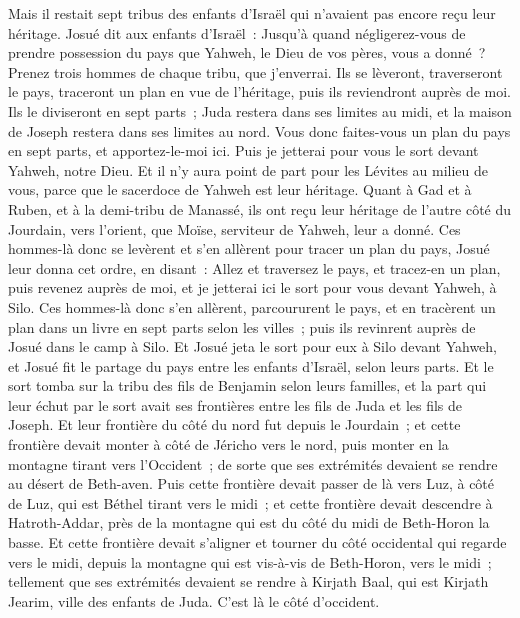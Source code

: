 \begin{multicols}{2}
Mais il restait sept tribus des enfants d'Israël qui n'avaient pas encore reçu leur héritage.
Josué dit aux enfants d'Israël~: Jusqu'à quand négligerez-vous de prendre possession du pays que Yahweh, le Dieu de vos pères, vous a donné~?
Prenez trois hommes de chaque tribu, que j'enverrai. Ils se lèveront, traverseront le pays, traceront un plan en vue de l'héritage, puis ils reviendront auprès de moi.
Ils le diviseront en sept parts~; Juda restera dans ses limites au midi, et la maison de Joseph restera dans ses limites au nord.
Vous donc faites-vous un plan du pays en sept parts, et apportez-le-moi ici. Puis je jetterai pour vous le sort devant Yahweh, notre Dieu.
Et il n'y aura point de part pour les Lévites au milieu de vous, parce que le sacerdoce de Yahweh est leur héritage. Quant à Gad et à Ruben, et à la demi-tribu de Manassé, ils ont reçu leur héritage de l'autre côté du Jourdain, vers l'orient, que Moïse, serviteur de Yahweh, leur a donné.
Ces hommes-là donc se levèrent et s'en allèrent pour tracer un plan du pays, Josué leur donna cet ordre, en disant~: Allez et traversez le pays, et tracez-en un plan, puis revenez auprès de moi, et je jetterai ici le sort pour vous devant Yahweh, à Silo.
Ces hommes-là donc s'en allèrent, parcoururent le pays, et en tracèrent un plan dans un livre en sept parts selon les villes~; puis ils revinrent auprès de Josué dans le camp à Silo.
Et Josué jeta le sort pour eux à Silo devant Yahweh, et Josué fit le partage du pays entre les enfants d'Israël, selon leurs parts.
Et le sort tomba sur la tribu des fils de Benjamin selon leurs familles, et la part qui leur échut par le sort avait ses frontières entre les fils de Juda et les fils de Joseph.
Et leur frontière du côté du nord fut depuis le Jourdain~; et cette frontière devait monter à côté de Jéricho vers le nord, puis monter en la montagne tirant vers l'Occident~; de sorte que ses extrémités devaient se rendre au désert de Beth-aven. 
Puis cette frontière devait passer de là vers Luz, à côté de Luz, qui est Béthel tirant vers le midi~; et cette frontière devait descendre à Hatroth-Addar, près de la montagne qui est du côté du midi de Beth-Horon la basse. 
Et cette frontière devait s'aligner et tourner du côté occidental qui regarde vers le midi, depuis la montagne qui est vis-à-vis de Beth-Horon, vers le midi~; tellement que ses extrémités devaient se rendre à Kirjath Baal, qui est Kirjath Jearim, ville des enfants de Juda. C'est là le côté d'occident. 

\end{multicols}
